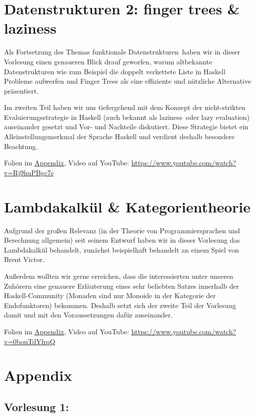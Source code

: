 \documentclass[10pt,a4paper]{article}
\begin{document}
\section{Datenstrukturen 2: finger trees \& laziness}

Als Fortsetzung des Themas \glqq funktionale Datenstrukturen\grqq\ haben wir in dieser Vorlesung einen genaueren Blick drauf geworfen, warum altbekannte Datenstrukturen wie zum Beispiel die doppelt verkettete Liste in Haskell Probleme aufwerfen und Finger Trees als eine effiziente und nützliche Alternative präsentiert.
\smallskip\smallskip

Im zweiten Teil haben wir uns tiefergehend mit dem Konzept der nicht-strikten Evaluierungsstrategie in Haskell (auch bekannt als \glqq laziness\grqq\ oder \glqq lazy evaluation\grqq) auseinander gesetzt und Vor- und Nachteile diskutiert. Diese Strategie bietet ein Alleinstellungsmerkmal der Sprache Haskell und verdient deshalb besondere Beachtung.

\bigskip
Folien im \hyperref[v10]{Appendix}, Video auf YouTube: \;\url{https://www.youtube.com/watch?v=Rj9huPBgc7s}

\section{Lambdakalkül \& Kategorientheorie}

Aufgrund der großen Relevanz (in der Theorie von Programmiersprachen und Berechnung allgemein) seit seinem Entwurf haben wir in dieser Vorlesung das Lambdakalkül behandelt, zunächst beispielhaft behandelt an einem Spiel von Brent Victor.
\smallskip\smallskip

Außerdem wollten wir gerne erreichen, dass die interessierten unter unseren Zuhörern eine
genauere Erläuterung eines sehr beliebten Satzes innerhalb der Haskell-Community (\glqq Monaden sind nur Monoide in der Kategorie der Endofunktoren\grqq) bekommen. Deshalb setzt sich der zweite Teil der Vorlesung damit und mit den Voraussetzungen dafür auseinander.

\bigskip
Folien im \hyperref[v11]{Appendix}, Video auf YouTube: \;\url{https://www.youtube.com/watch?v=0bouTdYfrqQ}

\newpage
\section{Appendix}

\subsection*{Vorlesung 1:}
\label{v1}

\end{document}
